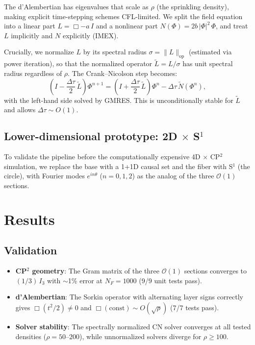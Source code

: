 \documentclass[12pt,a4paper]{article}
\begin{document}
The d'Alembertian has eigenvalues that scale as $\rho$ (the sprinkling
density), making explicit time-stepping schemes CFL-limited.  We split
the field equation into a linear part $L = \Box - a\,I$ and a nonlinear
part $N(\Phi) = 2b\,|\Phi|^2\,\Phi$, and treat $L$ implicitly and $N$
explicitly (IMEX).

Crucially, we normalize $L$ by its spectral radius
$\sigma = \|L\|_{\text{op}}$ (estimated via power iteration), so that
the normalized operator $\tilde{L} = L/\sigma$ has unit spectral radius
regardless of $\rho$.  The Crank--Nicolson step becomes:
\begin{equation}
  \left(I - \frac{\Delta\tau}{2}\,\tilde{L}\right) \Phi^{n+1}
  = \left(I + \frac{\Delta\tau}{2}\,\tilde{L}\right) \Phi^n
    - \Delta\tau\,\tilde{N}(\Phi^n),
\end{equation}
with the left-hand side solved by GMRES.  This is unconditionally stable
for $\tilde{L}$ and allows $\Delta\tau \sim O(1)$.

\subsection{Lower-dimensional prototype: 2D $\times$ S$^1$}

To validate the pipeline before the computationally expensive 4D $\times$
CP$^2$ simulation, we replace the base with a 1+1D causal set and the
fiber with S$^1$ (the circle), with Fourier modes $e^{in\theta}$
($n = 0, 1, 2$) as the analog of the three $\mathcal{O}(1)$ sections.

\section{Results}

\subsection{Validation}

\begin{itemize}
\item \textbf{CP$^2$ geometry}: The Gram matrix of the three
  $\mathcal{O}(1)$ sections converges to $(1/3)\,I_3$ with $\sim$1\%
  error at $N_F = 1000$ (9/9 unit tests pass).
\item \textbf{d'Alembertian}: The Sorkin operator with alternating
  layer signs correctly gives $\Box(t^2/2) \neq 0$ and
  $\Box(\text{const}) \sim O(\sqrt{\rho})$ (7/7 tests pass).
\item \textbf{Solver stability}: The spectrally normalized CN solver
  converges at all tested densities ($\rho = 50$--$200$), while
  unnormalized solvers diverge for $\rho \geq 100$.
\end{itemize}
\end{document}
